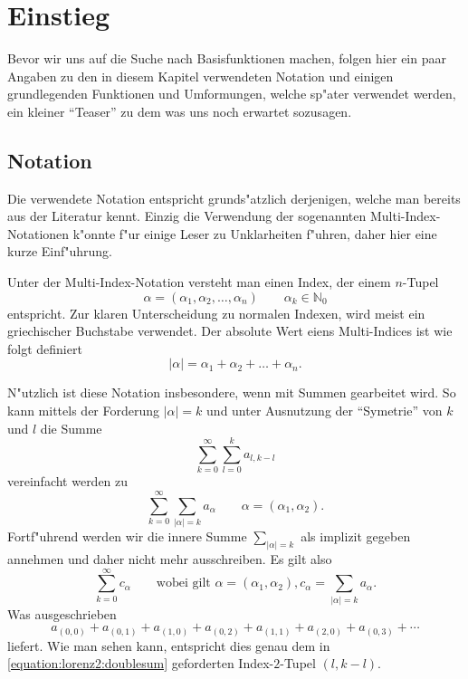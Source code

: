 \section{Einstieg\label{section:lorenz2:einstieg}}

Bevor wir uns auf die Suche nach Basisfunktionen machen, folgen hier ein paar 
Angaben zu den in diesem Kapitel verwendeten Notation und einigen grundlegenden 
Funktionen und Umformungen, welche sp"ater verwendet werden, ein kleiner 
``Teaser'' zu dem was uns noch erwartet sozusagen.

\subsection{Notation}
Die verwendete Notation entspricht grunds"atzlich derjenigen, welche man 
bereits aus der Literatur kennt. Einzig die Verwendung der 
sogenannten Multi-Index-Notationen k"onnte f"ur einige Leser zu Unklarheiten 
f"uhren, daher hier eine kurze Einf"uhrung.

Unter der Multi-Index-Notation versteht man einen Index, der einem 
$n$-Tupel
\begin{equation*}
	\alpha = (\alpha_1, \alpha_2, \dotsc, \alpha_n) \qquad \alpha_k \in 
	\mathbb{N}_{0}
\end{equation*}
entspricht. Zur klaren Unterscheidung zu normalen Indexen, wird meist ein 
griechischer Buchstabe verwendet. Der absolute Wert eiens Multi-Indices ist wie 
folgt definiert
\begin{equation*}
	|\alpha| = \alpha_1 + \alpha_2 + \dots + \alpha_n.
\end{equation*}
 
N"utzlich ist diese Notation insbesondere, wenn mit Summen gearbeitet wird. So 
kann mittels der Forderung $|\alpha| = k$ und unter Ausnutzung der ``Symetrie'' 
von $k$ und $l$ die Summe
\begin{equation}
	\sum_{k = 0}^{\infty}\sum_{l = 0}^{k}a_{l, k - l}
	\label{equation:lorenz2:doublesum}
\end{equation}
vereinfacht werden zu
\begin{equation*}
	\sum_{k = 0}^{\infty}\sum_{|\alpha| = k}a_{\alpha}
	\qquad \alpha = (\alpha_1, \alpha_2).
\end{equation*}
Fortf"uhrend werden wir die innere Summe $\sum_{|\alpha| = k}$ als implizit 
gegeben annehmen und daher nicht mehr ausschreiben. Es gilt also
\begin{equation}
	\sum_{k = 0}^{\infty}c_{\alpha}
	\qquad
	\text{wobei gilt }\alpha = (\alpha_1, \alpha_2),
	c_{\alpha} = \sum_{|\alpha| = k}a_{\alpha}.
	\label{equation:lorenz2:mmsum}
\end{equation}
Was ausgeschrieben
\begin{equation*}
	a_{(0,0)} + a_{(0,1)} + a_{(1,0)} + a_{(0,2)} + a_{(1,1)} + a_{(2,0)} + 
	a_{(0,3)} + 
	\dotsb
\end{equation*}
liefert. Wie man sehen kann, entspricht dies genau dem in 
\cref{equation:lorenz2:doublesum} geforderten Index-$2$-Tupel $(l, k - l)$.

